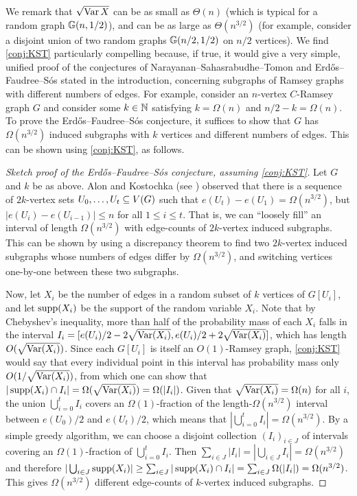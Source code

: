 \documentclass{daj}
\theoremstyle{plain}
\theoremstyle{plain}
\theoremstyle{plain}
\theoremstyle{plain}
\theoremstyle{definition}
\theoremstyle{plain}
\theoremstyle{plain}
\theoremstyle{definition}
\theoremstyle{definition}
\theoremstyle{plain}
\let\originalleft\left
\let\originalright\right
\renewcommand{\left}{\mathopen{}\mathclose\bgroup\originalleft}
\renewcommand{\right}{\aftergroup\egroup\originalright}
\begin{document}
We remark that $\sqrt{\operatorname{Var} X}$ can be as small as $\Theta(n)$ (which is typical for a random graph $\GG\left(n,1/2\right)$), and can be as large as $\Theta(n^{3/2})$ (for example, consider a disjoint union of two random graphs $\GG\left(n/2,1/2\right)$ on $n/2$ vertices). We find \cref{conj:KST} particularly compelling because, if true, it would give a very simple, unified proof of the conjectures of Narayanan--Sahasrabudhe--Tomon and Erd\H os--Faudree--S\'os stated in the introduction, concerning subgraphs of Ramsey graphs with different numbers of edges. For example, consider an $n$-vertex $C$-Ramsey graph $G$ and consider some $k\in \mathbb{N}$ satisfying $k=\Omega(n)$ and $n/2-k=\Omega(n)$. To prove the Erd\H os--Faudree--S\'os conjecture, it suffices to show that $G$ has $\Omega(n^{3/2})$ induced subgraphs with $k$ vertices and different numbers of edges. This can be shown using \cref{conj:KST}, as follows.
\begin{proof}[Sketch proof of the Erd\H os--Faudree--S\'os conjecture, assuming \cref{conj:KST}]
Let $G$ and $k$ be as above. Alon and Kostochka (see \cite[Equation~(2)]{AK09}) observed that there is a sequence of $2k$-vertex sets $U_0,\dots,U_t\subseteq V(G)$ such that $e(U_t)-e(U_1)=\Omega(n^{3/2})$, but $|e(U_i)-e(U_{i-1})|\le n$ for all $1\le i\le t$. That is, we can ``loosely fill'' an interval of length $\Omega(n^{3/2})$ with edge-counts of $2k$-vertex induced subgraphs. This can be shown by using a discrepancy theorem to find two $2k$-vertex induced subgraphs whose numbers of edges differ by $\Omega(n^{3/2})$, and switching vertices one-by-one between these two subgraphs.

Now, let $X_i$ be the number of edges in a random subset of $k$ vertices of $G[U_i]$, and let $\operatorname{supp}(X_i)$ be the support of the random variable $X_i$. Note that by Chebyshev's inequality, more than half of the probability mass of each $X_i$ falls in the interval $I_i=[e(U_i)/2-2\sqrt{\operatorname{Var}(X_i)},e(U_i)/2+2\sqrt{\operatorname{Var}(X_i)}]$, which has length $O(\sqrt{\operatorname{Var}(X_i)})$. Since each $G[U_i]$ is itself an $O(1)$-Ramsey graph, \cref{conj:KST} would say that every individual point in this interval has probability mass only $O(1/\sqrt{\operatorname{Var}(X_i)})$, from which one can show that $|\operatorname{supp}(X_i)\cap I_i|=\Omega(\sqrt{\operatorname{Var}(X_i)})=\Omega(|I_i|)$. Given that $\sqrt{\operatorname{Var}(X_i)}=\Omega(n)$ for all $i$, the union $\bigcup_{i=0}^t I_i$ covers an $\Omega(1)$-fraction of the length-$\Omega(n^{3/2})$ interval between $e(U_0)/2$ and $e(U_t)/2$, which means that $|\bigcup_{i=0}^tI_i|= \Omega(n^{3/2})$. By a simple greedy algorithm, we can choose a disjoint collection $(I_i)_{i\in J}$ of intervals covering an $\Omega(1)$-fraction of $\bigcup_{i=0}^t I_i$. Then $\sum _{i\in J} |I_i|= |\bigcup_{i\in J}I_i|=\Omega(n^{3/2})$ and therefore $|\bigcup_{i\in J} \operatorname{supp}(X_i)|\geq \sum _{i\in J} |\operatorname{supp}(X_i)\cap I_i|=\sum _{i\in J} \Omega(|I_i|)=\Omega(n^{3/2})$. This gives $\Omega(n^{3/2})$ different edge-counts of $k$-vertex induced subgraphs.
\end{proof}
\end{document}
